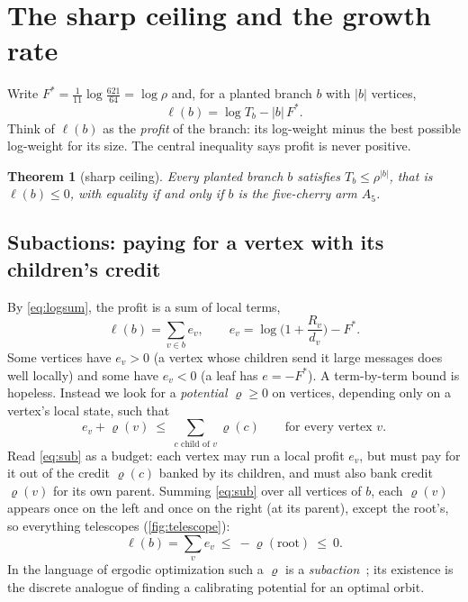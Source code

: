 \documentclass[11pt]{article}
\newtheorem{theorem}{Theorem}
\theoremstyle{definition}
\newcommand{\bell}{\ell}
\newcommand{\Fs}{F^{\ast}}
\begin{document}
\section{The sharp ceiling and the growth rate}\label{sec:ceiling}

Write $\Fs=\tfrac1{11}\log\tfrac{621}{64}=\log\rho$ and, for a planted branch $b$ with $|b|$ vertices,
\[
  \bell(b)=\log T_b-|b|\,\Fs .
\]
Think of $\bell(b)$ as the \emph{profit} of the branch: its log-weight minus the best possible
log-weight for its size. The central inequality says profit is never positive.

\begin{theorem}[sharp ceiling]\label{thm:sharp}
Every planted branch $b$ satisfies $T_b\le\rho^{|b|}$, that is $\bell(b)\le0$, with equality if and only
if $b$ is the five-cherry arm $A_5$.
\end{theorem}

\subsection{Subactions: paying for a vertex with its children's credit}

By \eqref{eq:logsum}, the profit is a sum of local terms,
\[
  \bell(b)=\sum_{v\in b}e_v,\qquad e_v=\log\Big(1+\frac{R_v}{d_v}\Big)-\Fs .
\]
Some vertices have $e_v>0$ (a vertex whose children send it large messages does well locally) and some
have $e_v<0$ (a leaf has $e=-\Fs$). A term-by-term bound is hopeless. Instead we look for a
\emph{potential} $\varrho\ge0$ on vertices, depending only on a vertex's local state, such that
\begin{equation}\label{eq:sub}
  e_v+\varrho(v)\ \le\ \sum_{c\text{ child of }v}\varrho(c)\qquad\text{for every vertex }v.
\end{equation}
Read \eqref{eq:sub} as a budget: each vertex may run a local profit $e_v$, but must pay for it out of
the credit $\varrho(c)$ banked by its children, and must also bank credit $\varrho(v)$ for its own
parent. Summing \eqref{eq:sub} over all vertices of $b$, each $\varrho(v)$ appears once on the left and
once on the right (at its parent), except the root's, so everything telescopes (\cref{fig:telescope}):
\[
  \bell(b)=\sum_ve_v\ \le\ -\varrho(\mathrm{root})\ \le\ 0 .
\]
In the language of ergodic optimization such a $\varrho$ is a \emph{subaction}~\cite{Bousch2001,Jenkinson2019}; its
existence is the discrete analogue of finding a calibrating potential for an optimal orbit.
\end{document}
